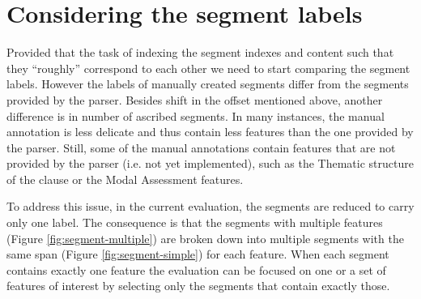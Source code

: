 \section{Considering the segment labels}
\label{sec:segment-labels}

Provided that the task of indexing the segment indexes and content such that they ``roughly'' correspond to each other we need to start comparing the segment labels. However the labels of manually created segments differ from the segments provided by the parser. Besides shift in the offset mentioned above, another difference is in number of ascribed segments. In many instances, the manual annotation is less delicate and thus contain less features than the one provided by the parser. Still, some of the manual annotations contain features that are not provided by the parser (i.e. not yet implemented), such as the Thematic structure of the clause or the Modal Assessment features. 

To address this issue, in the current evaluation, the segments are reduced to carry only one label. The consequence is that the segments with multiple features (Figure \ref{fig:segment-multiple}) are broken down into multiple segments with the same span (Figure \ref{fig:segment-simple}) for each feature. When each segment contains exactly one feature the evaluation can be focused on one or a set of features of interest by selecting only the segments that contain exactly those. 

